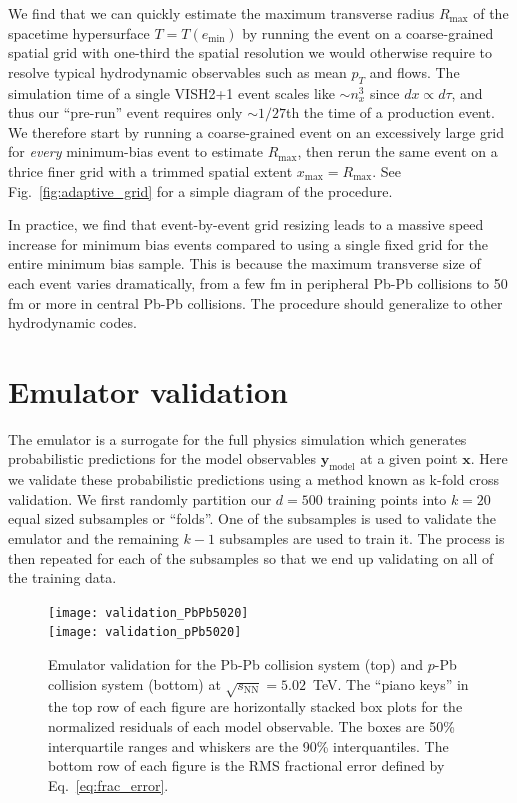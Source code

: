 \documentclass[aps,prc,reprint,amsmath,nofootinbib]{revtex4-1}
\newcommand{\sqrts}{\sqrt{s_\mathrm{NN}}}
\newcommand{\xv}{\mathbf x}
\newcommand{\ym}{{\mathbf y}_\text{model}}
\begin{document}
We find that we can quickly estimate the maximum transverse radius $R_\text{max}$ of the spacetime hypersurface ${T = T(e_\text{min})}$ by running the event on a coarse-grained spatial grid with one-third the spatial resolution we would otherwise require to resolve typical hydrodynamic observables such as mean $p_T$ and flows.
The simulation time of a single VISH2+1 event scales like ${\sim}n_x^3$ since $dx \propto d\tau$, and thus our ``pre-run'' event requires only ${\sim}1/27$th the time of a production event.
We therefore start by running a coarse-grained event on an excessively large grid for \emph{every} minimum-bias event to estimate $R_\text{max}$, then rerun the same event on a thrice finer grid with a trimmed spatial extent $x_\text{max} = R_\text{max}$.
See Fig.~\ref{fig:adaptive_grid} for a simple diagram of the procedure.

In practice, we find that event-by-event grid resizing leads to a massive speed increase for minimum bias events compared to using a single fixed grid for the entire minimum bias sample.
This is because the maximum transverse size of each event varies dramatically, from a few fm in peripheral Pb-Pb collisions to 50 fm or more in central Pb-Pb collisions.
The procedure should generalize to other hydrodynamic codes.


\section{Emulator validation}
\label{app:validation}

The emulator is a surrogate for the full physics simulation which generates probabilistic predictions for the model observables $\ym$ at a given point $\xv$.
Here we validate these probabilistic predictions using a method known as k-fold cross validation.
We first randomly partition our $d=500$ training points into $k=20$ equal sized subsamples or ``folds''.
One of the subsamples is used to validate the emulator and the remaining $k-1$ subsamples are used to train it.
The process is then repeated for each of the subsamples so that we end up validating on all of the training data.

\begin{figure}[b]
  \texttt{[image: validation\_PbPb5020]}\\
  \texttt{[image: validation\_pPb5020]}
  \caption{
    \label{fig:validation_all}
    Emulator validation for the Pb-Pb collision system (top) and $p$-Pb collision system (bottom) at $\sqrts=5.02$~TeV.
    The ``piano keys'' in the top row of each figure are horizontally stacked box plots for the normalized residuals of each model observable.
    The boxes are 50\% interquartile ranges and whiskers are the 90\% interquantiles.
    The bottom row of each figure is the RMS fractional error defined by Eq.~\eqref{eq:frac_error}.
  }
\end{figure}
\end{document}
